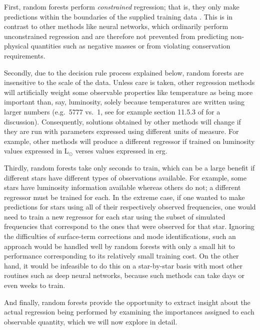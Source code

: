 \documentclass[twocolumn,twocolappendix]{aastex6}
\begin{document}
First, random forests perform \emph{constrained} regression; that is, they only make predictions within the boundaries of the supplied training data \citep[see e.g.][Section 9.2.1]{hastie2005elements}. This is in contrast to other methods like neural networks, which ordinarily perform unconstrained regression and are therefore not prevented from predicting non-physical quantities such as negative masses or from violating conservation requirements. 

Secondly, due to the decision rule process explained below, random forests are insensitive to the scale of the data. Unless care is taken, other regression methods will artificially weight some observable properties like temperature as being more important than, say, luminosity, solely because temperatures are written using larger numbers (e.g.\ 5777 vs.\ 1, see for example section 11.5.3 of \citealt{hastie2005elements} for a discussion). Consequently, solutions obtained by other methods will change if they are run with parameters expressed using different units of measure. For example, other methods will produce a different regressor if trained on luminosity values expressed in L$_\odot$ verses values expressed in erg. 

Thirdly, random forests take only seconds to train, which can be a large benefit if different stars have different types of observations available. For example, some stars have luminosity information available whereas others do not; a different regressor must be trained for each. In the extreme case, if one wanted to make predictions for stars using all of their respectively observed frequencies, one would need to train a new regressor for each star using the subset of simulated frequencies that correspond to the ones that were observed for that star. Ignoring the difficulties of surface-term corrections and mode identifications, such an approach would be handled well by random forests with only a small hit to performance corresponding to its relatively small training cost. On the other hand, it would be infeasible to do this on a star-by-star basis with most other routines such as deep neural networks, because such methods can take days or even weeks to train. 

And finally, random forests provide the opportunity to extract insight about the actual regression being performed by examining the importances assigned to each observable quantity, which we will now explore in detail. 
\end{document}
